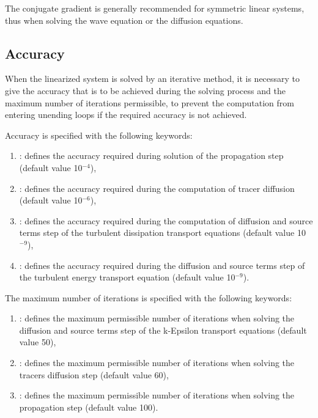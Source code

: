  The conjugate gradient is generally recommended for symmetric linear systems, thus when solving the wave equation or the diffusion equations.


\subsection{ Accuracy}

 When the linearized system is solved by an iterative method, it is necessary to give the accuracy that is to be achieved during the solving process and the maximum number of iterations permissible, to prevent the computation from entering unending loops if the required accuracy is not achieved.

 Accuracy is specified with the following keywords:

\begin{enumerate}
\item  {} : defines the accuracy required during solution of the propagation step (default value 10${}^{-4}$),

\item  {}: defines the accuracy required during the computation of tracer diffusion (default value 10${}^{-6}$),

\item  {} : defines the accuracy required during the computation of diffusion and source terms step of the turbulent dissipation transport equations (default value 10${}^{-9}$),

\item  {}: defines the accuracy required during the diffusion and source terms step of the turbulent energy transport equation (default value 10${}^{-9}$).
\end{enumerate}

 The maximum number of iterations is specified with the following keywords:

\begin{enumerate}
\item  {} : defines the maximum permissible number of iterations when solving the diffusion and source terms step of the k-Epsilon transport equations (default value 50),

\item  {}: defines the maximum permissible number of iterations when solving the tracers diffusion step (default value 60),

\item  {}: defines the maximum permissible number of iterations when solving the propagation step (default value 100).
\end{enumerate}

